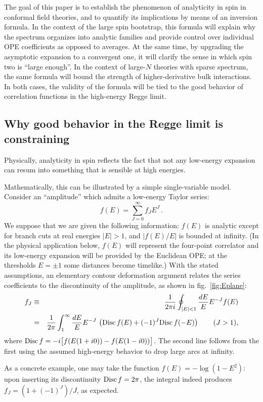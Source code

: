 \documentclass[11pt, reqno,preprint]{article}
\def\be{\begin{equation}}
\def\ee{\end{equation}}
\def\ba{\begin{eqnarray}}
\def\ea{\end{eqnarray}}
\def\j{J}
\begin{document}
The goal of this paper is to establish the phenomenon of analyticity in spin in conformal field theories,
and to quantify its implications by means of an inversion formula.
In the context of the large spin bootstrap, this formula will explain why the spectrum organizes into analytic families
and provide control over individual OPE coefficients as opposed to averages.
At the same time, by upgrading the asymptotic expansion to a convergent one, it will clarify the sense in which spin two is ``large enough''.  In the context of large-$N$ theories with sparse spectrum, the same formula will
bound the strength of higher-derivative bulk interactions.
In both cases, the validity of the formula will be tied to the good behavior of correlation functions
in the high-energy Regge limit.

\subsection{Why good behavior in the Regge limit is constraining}\label{ssec:toy}

\def\Mi{f}
Physically, analyticity in spin reflects the fact that not any low-energy expansion can resum into
something that is sensible at high energies.

Mathematically, this can be illustrated by a  simple single-variable model.
Consider an ``amplitude'' which admits a low-energy Taylor series:
\be
 \Mi(E)= \sum_{\j=0}^\infty \Mi_\j E^\j\,.
 \label{example_f_rho}
\ee
We suppose that we are given the following information: $\Mi(E)$ is analytic except for branch cuts at real energies $|E|>1$,
and $|\Mi(E)/E|$ is bounded at infinity.  (In the physical application below,
$\Mi(E)$ will represent the four-point correlator and its low-energy expansion will be provided by the Euclidean OPE;
at the thresholds $E=\pm 1$ some distances become timelike.)
With the stated assumptions, an elementary contour deformation argument relates the series coefficients
to the discontinuity of the amplitude, as shown in fig.~\ref{fig:Eplane}:
\ba
 \Mi_\j &\equiv& \frac{1}{2\pi i}\oint_{|E|<1} \frac{dE}{E} E^{-\j} \Mi(E)
 \\ &=& \frac{1}{2\pi}\int_1^\infty  \frac{dE}{E} E^{-\j}\,\left({\rm Disc}\,\Mi(E)+(-1)^\j {\rm Disc}\,\Mi(-E)\right) \qquad (\j> 1), \label{example_fj_int}
\ea
where ${\rm Disc}\,f=-i\big[\Mi(E(1+i0))-\Mi(E(1-i0))\big]$. The second line follows from the first
using the assumed high-energy behavior to drop large arcs at infinity.

As a concrete example, one may take the function $\Mi(E)=-\log(1-E^2)$:
upon inserting its discontinuity
${\rm Disc}\,\Mi=2\pi$, the integral indeed produces $\Mi_\j=(1+(-1)^\j)/\j$, as expected.
\end{document}
